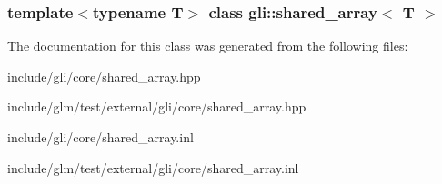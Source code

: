 \subsubsection*{template$<$typename \-T$>$ class gli\-::shared\-\_\-array$<$ T $>$}



\-The documentation for this class was generated from the following files\-:\begin{DoxyCompactItemize}
\item 
include/gli/core/shared\-\_\-array.\-hpp\item 
include/glm/test/external/gli/core/shared\-\_\-array.\-hpp\item 
include/gli/core/shared\-\_\-array.\-inl\item 
include/glm/test/external/gli/core/shared\-\_\-array.\-inl\end{DoxyCompactItemize}
